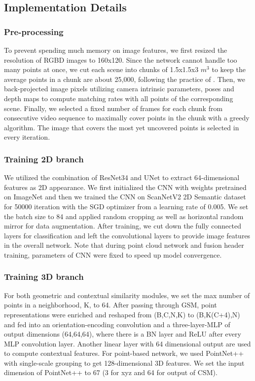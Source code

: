 \documentclass[letterpaper, 10 pt, conference]{ieeeconf}
\begin{document}
\subsection{Implementation Details}

\subsubsection{\textbf{Pre-processing}}

To prevent spending much memory on image features, we first resized the resolution of RGBD images to 160x120. 
Since the network cannot handle too many points at once, we cut each scene into chunks of 1.5x1.5x3 $m^{3}$ to keep the average points in a chunk are about 25,000, following the practice of \cite{qi2017pointnet,qi2017pointnet++}.
Then, we back-projected image pixels utilizing camera intrinsic parameters, poses and depth maps to compute matching rates with all points of the corresponding scene. 
Finally, we selected a fixed number of frames for each chunk from consecutive video sequence to maximally cover points in the chunk with a greedy algorithm. The image that covers the most yet uncovered points is selected in every iteration.


\subsubsection{\textbf{Training 2D branch}}
We utilized the combination of ResNet34 \cite{he2016deep} and UNet \cite{ronneberger2015u} to extract 64-dimensional features as 2D appearance. We first initialized the CNN with weights pretrained on ImageNet and then we trained the CNN on ScanNetV2 2D Semantic dataset for 50000 iteration with the SGD optimizer from a learning rate of 0.005. We set the batch size to 84 and applied random cropping as well as horizontal random mirror for data augmentation. After training, we cut down the fully connected layers for classification and left the convolutional layers to provide image features in the overall network. Note that during point cloud network and fusion header training, parameters of CNN were fixed to speed up model convergence.

\subsubsection{\textbf{Training 3D branch}}
For both geometric and contextual similarity modules, we set the max number of points in a neighborhood, K, to 64. After passing through GSM, point representations were enriched and reshaped from (B,C,N,K) to (B,K(C+4),N) and fed into an orientation-encoding convolution and a three-layer-MLP of output dimensions (64,64,64), where there is a BN layer and ReLU after every MLP convolution layer. Another linear layer with 64 dimensional output are used to compute contextual features.
For point-based network, we used PointNet++ with single-scale grouping to get 128-dimensional 3D features. We set the input dimension of PointNet++ to 67 (3 for xyz and 64 for output of CSM).
\end{document}

